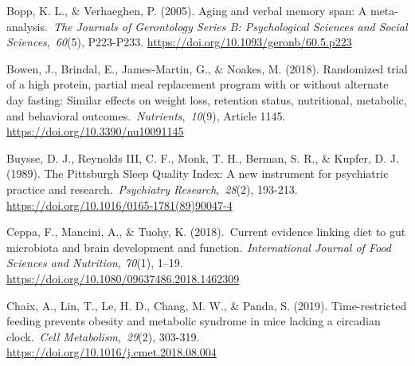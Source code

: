 \documentclass[authordate, empirical]{jote-new-article}
\begin{document}



Bopp, K. L., \& Verhaeghen, P. (2005). Aging and verbal memory span: A meta-analysis. \emph{The Journals of Gerontology Series B: Psychological Sciences and Social Sciences}, \emph{60}(5), P223-P233. \url{https://doi.org/10.1093/geronb/60.5.p223}



Bowen, J., Brindal, E., James-Martin, G., \& Noakes, M. (2018). Randomized trial of a high protein, partial meal replacement program with or without alternate day fasting: Similar effects on weight loss, retention status, nutritional, metabolic, and behavioral outcomes. \emph{Nutrients}, \emph{10}(9), Article 1145. \url{https://doi.org/10.3390/nu10091145}






Buysse, D. J., Reynolds III, C. F., Monk, T. H., Berman, S. R., \& Kupfer, D. J. (1989). The Pittsburgh Sleep Quality Index: A new instrument for psychiatric practice and research. \emph{Psychiatry Research}, \emph{28}(2), 193-213. \url{https://doi.org/10.1016/0165-1781(89)90047-4}



Ceppa, F., Mancini, A., \& Tuohy, K. (2018). Current evidence linking diet to gut microbiota and brain development and function\emph{. International Journal of Food Sciences and Nutrition, 70}(1), 1--19\emph{.} \url{https://doi.org/10.1080/09637486.2018.1462309}



Chaix, A., Lin, T., Le, H. D., Chang, M. W., \& Panda, S. (2019). Time-restricted feeding prevents obesity and metabolic syndrome in mice lacking a circadian clock. \emph{Cell Metabolism}, \emph{29}(2), 303-319. \url{https://doi.org/10.1016/j.cmet.2018.08.004}



\end{document}
